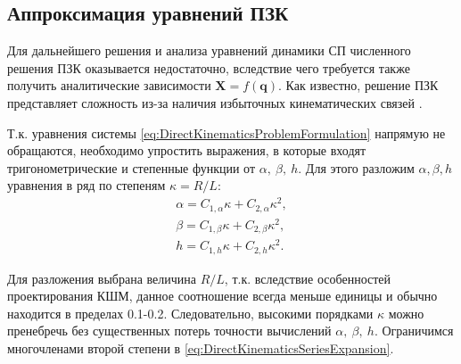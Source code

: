 \subsection{Аппроксимация уравнений ПЗК}

Для дальнейшего решения и анализа уравнений динамики СП численного решения ПЗК оказывается недостаточно, вследствие чего требуется также получить аналитические зависимости $\mathbf{X}=f\left(\mathbf{q}\right)$.
Как известно, решение ПЗК представляет сложность из-за наличия избыточных кинематических связей \cite{2014c,Bonev2000,Niu2013,Lapikov2014,2007,Charters2009,Kucuk2006,Hu2011,Jiang2008}.

Т.к. уравнения системы \ref{eq:DirectKinematicsProblemFormulation} напрямую не обращаются, необходимо упростить выражения, в которые входят тригонометрические и степенные функции от $\alpha,~\beta,~h$. Для этого разложим $\alpha, \beta, h$ уравнения  в ряд по степеням $\kappa = R/L$:
\begin{equation}
\label{eq:DirectKinematicsSeriesExpansion}
\begin{aligned}
	\alpha = C_{1,\alpha}\kappa + C_{2,\alpha}\kappa^2, \\
	\beta = C_{1,\beta}\kappa + C_{2,\beta}\kappa^2, \\
	h = C_{1,h}\kappa + C_{2,h}\kappa^2.
\end{aligned}
\end{equation}

Для разложения выбрана величина $R/L$, т.к. вследствие особенностей проектирования КШМ, данное соотношение всегда меньше единицы и обычно находится в пределах 0.1-0.2. Следовательно, высокими порядками $\kappa$ можно пренебречь без существенных потерь точности вычислений $\alpha,~\beta,~h$. Ограничимся многочленами второй степени в \ref{eq:DirectKinematicsSeriesExpansion}.

